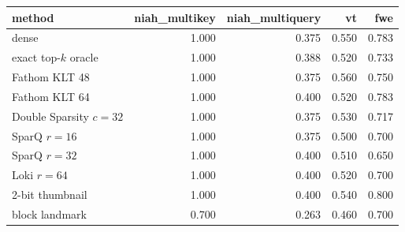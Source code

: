 \begin{tabular}{lrrrr}
\toprule
method & niah\_multikey & niah\_multiquery & vt & fwe \\
\midrule
dense & 1.000 & 0.375 & 0.550 & 0.783 \\
exact top-$k$ oracle & 1.000 & 0.388 & 0.520 & 0.733 \\
Fathom KLT 48 & 1.000 & 0.375 & 0.560 & 0.750 \\
Fathom KLT 64 & 1.000 & 0.400 & 0.520 & 0.783 \\
Double Sparsity $c{=}32$ & 1.000 & 0.375 & 0.530 & 0.717 \\
SparQ $r{=}16$ & 1.000 & 0.375 & 0.500 & 0.700 \\
SparQ $r{=}32$ & 1.000 & 0.400 & 0.510 & 0.650 \\
Loki $r{=}64$ & 1.000 & 0.400 & 0.520 & 0.700 \\
2-bit thumbnail & 1.000 & 0.400 & 0.540 & 0.800 \\
block landmark & 0.700 & 0.263 & 0.460 & 0.700 \\
\bottomrule
\end{tabular}